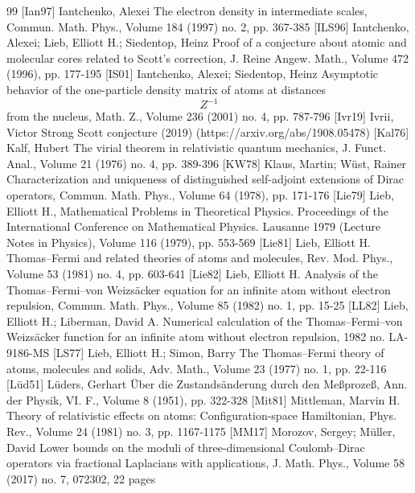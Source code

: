 \documentclass[10pt]{amsart}
\theoremstyle{definition}
\begin{document}
\begin{thebibliography}{99}
 [Ian97] Iantchenko, Alexei The electron density in intermediate scales, Commun. Math. Phys., Volume 184 (1997) no. 2, pp. 367-385
 [ILS96] Iantchenko, Alexei; Lieb, Elliott H.; Siedentop, Heinz Proof of a conjecture about atomic and molecular cores related to Scott’s correction, J. Reine Angew. Math., Volume 472 (1996), pp. 177-195
 [IS01] Iantchenko, Alexei; Siedentop, Heinz Asymptotic behavior of the one-particle density matrix of atoms at distances $${Z}^ {-1}$$ from the nucleus, Math. Z., Volume 236 (2001) no. 4, pp. 787-796
 [Ivr19] Ivrii, Victor Strong Scott conjecture (2019) (https://arxiv.org/abs/1908.05478)
 [Kal76] Kalf, Hubert The virial theorem in relativistic quantum mechanics, J. Funct. Anal., Volume 21 (1976) no. 4, pp. 389-396
 [KW78] Klaus, Martin; Wüst, Rainer Characterization and uniqueness of distinguished self-adjoint extensions of Dirac operators, Commun. Math. Phys., Volume 64 (1978), pp. 171-176
 [Lie79] Lieb, Elliott H., Mathematical Problems in Theoretical Physics. Proceedings of the International Conference on Mathematical Physics. Lausanne 1979 (Lecture Notes in Physics), Volume 116 (1979), pp. 553-569
 [Lie81] Lieb, Elliott H. Thomas–Fermi and related theories of atoms and molecules, Rev. Mod. Phys., Volume 53 (1981) no. 4, pp. 603-641
 [Lie82] Lieb, Elliott H. Analysis of the Thomas–Fermi–von Weizsäcker equation for an infinite atom without electron repulsion, Commun. Math. Phys., Volume 85 (1982) no. 1, pp. 15-25
 [LL82] Lieb, Elliott H.; Liberman, David A. Numerical calculation of the Thomas–Fermi–von Weizsäcker function for an infinite atom without electron repulsion, 1982 no. LA-9186-MS
 [LS77] Lieb, Elliott H.; Simon, Barry The Thomas–Fermi theory of atoms, molecules and solids, Adv. Math., Volume 23 (1977) no. 1, pp. 22-116
 [Lüd51] Lüders, Gerhart Über die Zustandsänderung durch den Meßprozeß, Ann. der Physik, VI. F., Volume 8 (1951), pp. 322-328
 [Mit81] Mittleman, Marvin H. Theory of relativistic effects on atoms: Configuration-space Hamiltonian, Phys. Rev., Volume 24 (1981) no. 3, pp. 1167-1175
 [MM17] Morozov, Sergey; Müller, David Lower bounds on the moduli of three-dimensional Coulomb–Dirac operators via fractional Laplacians with applications, J. Math. Phys., Volume 58 (2017) no. 7, 072302, 22 pages

\end{thebibliography}
\end{document}
